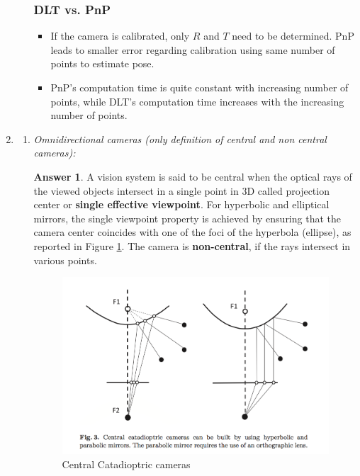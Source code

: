 \documentclass[a4paper,12 pt]{article}
\theoremstyle{definition}
\theoremstyle{remark}
\theoremstyle{definition}
\theoremstyle{definition}
\theoremstyle{definition}
\theoremstyle{definition}
\theoremstyle{remark}
\theoremstyle{remark}
\theoremstyle{definition}
\theoremstyle{definition}
\newtheorem*{answer}{Answer}
\begin{document}
\begin{enumerate}
\begin{enumerate}
\subsubsection*{DLT vs. PnP}
\begin{itemize}
\item If the camera is calibrated, only $R$ and $T$ need to be determined. PnP leads to smaller error regarding calibration using same number of points to estimate pose.
\item PnP's computation time is quite constant with increasing number of points, while DLT's computation time increases with the increasing number of points.
\end{itemize}
\end{enumerate}
\item \begin{enumerate}
\item \textit{Omnidirectional cameras (only definition of central and non central cameras):}
\begin{answer}
A vision system is said to be central when the optical rays of the viewed objects intersect in a single point in 3D called projection center or \textbf{single effective viewpoint}. For hyperbolic and elliptical mirrors, the single viewpoint property is achieved by ensuring that the camera center coincides with one of the foci of the hyperbola (ellipse), as reported in Figure \ref{fig:fuochi}.
 The camera is \textbf{non-central}, if the rays intersect in various points. 
 \begin{figure}[tbh]
\begin{center}
\includegraphics[scale=0.35]{pics/fuochi}
\caption{Central Catadioptric cameras\label{fig:fuochi}}
\end{center}

\end{figure}
\end{answer}
\end{enumerate}
\end{enumerate}
\end{document}

